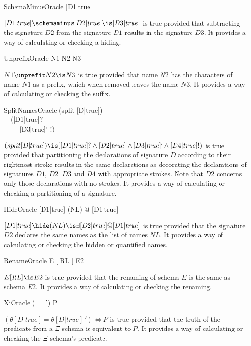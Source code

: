 \begin{zedoracle}{SchemaMinusOracle}
  [D1|true] \schemaminus [D2|true] \is [D3|true]
\end{zedoracle}
$[D1|true] \schemaminus [D2|true] \is [D3|true]$ is true provided that
subtracting the signature $D2$ from the signature $D1$
results in the signature $D3$.
It provides a way of calculating or checking a hiding.


\begin{zedoracle}{UnprefixOracle}
  N1 \unprefix N2 \is N3
\end{zedoracle}
$N1 \unprefix N2 \is N3$ is true provided that
name $N2$ has the characters of name $N1$ as a prefix,
which when removed leaves the name $N3$.
It provides a way of calculating or checking the suffix.

\begin{zedoracle}{SplitNamesOracle}
  (split [D|true]) \is {}\\~~([D1|true]? \land [D2|true] \land {}\\~~~~ [D3|true]' \land [D4|true]!)
\end{zedoracle}
$(split [D|true]) \is ([D1|true]? \land [D2|true] \land [D3|true]' \land [D4|true]!)$ is true provided that
partitioning the declarations of signature $D$ according to their rightmost stroke
results in the same declarations as decorating the declarations of signatures
$D1$, $D2$, $D3$ and $D4$ with appropriate strokes.
Note that $D2$ concerns only those declarations with no strokes.
It provides a way of calculating or checking a partitioning of a signature.

\begin{zedoracle}{HideOracle}
  [D1|true] \hide (NL) \is \exists [D2|true] @ [D1|true]
\end{zedoracle}
$[D1|true] \hide (NL) \is \exists [D2|true] @ [D1|true]$ is true provided that
the signature $D2$ declares the same names as the list of names $NL$.
It provides a way of calculating or checking the hidden or quantified names.

\begin{zedoracle}{RenameOracle}
  E [ RL ] \is E2
\end{zedoracle}
$E [ RL ] \is E2$ is true provided that the renaming of schema $E$
is the same as schema $E2$.
It provides a way of calculating or checking the renaming.

\begin{zedoracle}{XiOracle}
  (\theta [D|true] = \theta [D|true]~') \iff P
\end{zedoracle}
$(\theta [D|true] = \theta [D|true]~') \iff P$ is true provided that
the truth of the predicate from a $\Xi$ schema is equivalent to $P$.
It provides a way of calculating or checking the $\Xi$ schema's predicate.

%
\endinput
